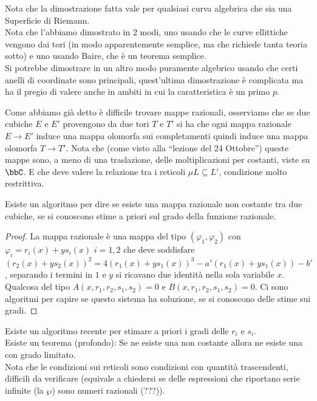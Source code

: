 
\begin{osservazione}
Nota che la dimostrazione fatta vale per qualsiasi curva algebrica che sia una Superficie di Riemann.\\
Nota che l'abbiamo dimostrato in 2 modi, uno usando che le curve ellittiche vengono dai tori (in modo apparentemente semplice, ma che richiede tanta teoria sotto) e uno usando Baire, che è un teorema semplice.\\
Si potrebbe dimostrare in un altro modo puramente algebrico usando che certi anelli di coordinate sono principali, quest'ultima dimostrazione è complicata ma ha il pregio di valere anche in ambiti in cui la caratteristica è un primo $p$.
\end{osservazione}

Come abbiamo già detto è difficile trovare mappe razionali, osserviamo che se due cubiche $E$ e $E'$ provengono da due tori $T$ e $T'$ si ha che ogni mappa razionale $E\rightarrow E'$ induce una mappa olomorfa sui completamenti quindi induce una mappa olomorfa $T\rightarrow T'$. Nota che (come visto alla ``lezione del 24 Ottobre'') queste mappe sono, a meno di una traslazione, delle moltiplicazioni per costanti, viste su $\bbC$. E che deve valere la relazione tra i reticoli $\mu L\subseteq L'$, condizione molto restrittiva.

\begin{proposizione}
Esiste un algoritmo per dire se esiste una mappa razionale non costante tra due cubiche, se si conoscono stime a priori sul grado della funzione razionale.
\end{proposizione}

\begin{proof} La mappa razionale è una mappa del tipo $(\varphi_1,\varphi_2)$ con $\varphi_i=r_i(x)+y s_i(x)$ $i=1,2$  che deve soddisfare $(r_2(x)+y s_2(x))^2=4(r_1(x)+y s_1(x))^3-a'(r_1(x)+y s_1(x))-b'$, separando i termini in $1$ e $y$ si ricavano due identità nella sola variabile $x$. Qualcosa del tipo $A(x,r_1,r_2,s_1,s_2)=0$ e $B(x,r_1,r_2,s_1,s_2)=0$. Ci sono algoritmi per capire se questo sistema ha soluzione, se si conoscono delle stime sui gradi.
\end{proof}

\begin{osservazione} Esiste un algoritmo recente per stimare a priori i gradi delle $r_i$ e $s_i$.\\
Esiste un teorema (profondo): Se ne esiste una non costante allora ne esiste una con grado limitato.\\
Nota che le condizioni sui reticoli sono condizioni con quantità trascendenti, difficili da verificare (equivale a chiedersi se delle espressioni che riportano serie infinite (la $\wp$) sono numeri razionali (???)).
\end{osservazione}
